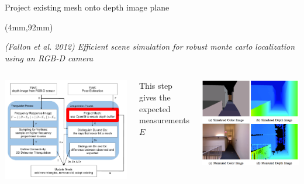 \documentclass{beamer}
\newenvironment{reference}[2]{%
  \begin{textblock*}{\textwidth}(#1,#2)

      \tiny\it\bgroup\color{red!50!black}}{\egroup\end{textblock*}}
\begin{document}
\begin{frame}{Project existing mesh onto depth image plane}
\begin{reference}{4mm}{92mm}
(Fallon et al. 2012) Efficient scene simulation for robust monte carlo localization using an RGB-D camera
\end{reference} 
\vspace{-.1in}
\begin{columns}
  \begin{center}
  \includegraphics[width=\textwidth]{SDproject.pdf} 
  \end{center}
  This step gives the expected measurements $E$
  \vspace{-.1in}
  \begin{center}
  \includegraphics[width=.9\textwidth]{m_proj.png} 
  \end{center}
\end{columns}
\end{frame}
\end{document}
